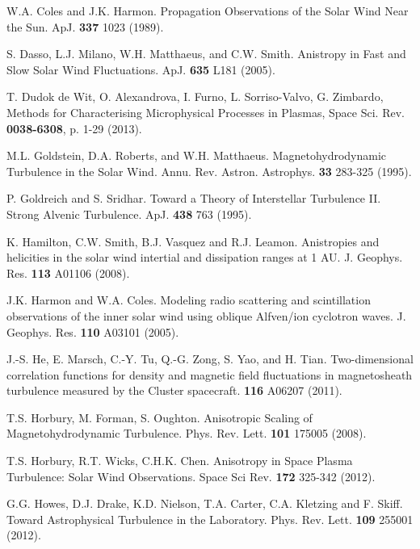 \documentclass[preprint2]{aastex}
\begin{document}
\begin{thebibliography}{}
 W.A. Coles and J.K. Harmon. Propagation Observations of the Solar Wind Near the Sun. ApJ. {\bf 337} 1023 (1989).

 S. Dasso, L.J. Milano, W.H. Matthaeus, and C.W. Smith. Anistropy in Fast and Slow Solar Wind Fluctuations. ApJ. {\bf 635} L181 (2005).

 T. Dudok de Wit, O. Alexandrova, I. Furno, L. Sorriso-Valvo, G. Zimbardo, Methods for Characterising Microphysical Processes in Plasmas, Space Sci. Rev. {\bf 0038-6308}, p. 1-29 (2013).

 M.L. Goldstein, D.A. Roberts, and W.H. Matthaeus. Magnetohydrodynamic Turbulence in the Solar Wind. Annu. Rev. Astron. Astrophys. {\bf 33} 283-325 (1995).

 P. Goldreich and S. Sridhar. Toward a Theory of Interstellar Turbulence II. Strong Alvenic Turbulence. ApJ. {\bf 438} 763 (1995).

 K. Hamilton, C.W. Smith, B.J. Vasquez and R.J. Leamon. Anistropies and helicities in the solar wind intertial and dissipation ranges at 1 AU. J. Geophys. Res. {\bf 113} A01106 (2008).

 J.K. Harmon and W.A. Coles. Modeling radio scattering and scintillation observations of the inner solar wind using oblique Alfven/ion cyclotron waves. J. Geophys. Res. {\bf 110} A03101 (2005).

 J.-S. He, E. Marsch, C.-Y. Tu, Q.-G. Zong, S. Yao, and H. Tian. Two-dimensional correlation functions for density and magnetic field fluctuations in magnetosheath turbulence measured by the Cluster spacecraft. {\bf 116} A06207 (2011).

 T.S. Horbury, M. Forman, S. Oughton. Anisotropic Scaling of Magnetohydrodynamic Turbulence. Phys. Rev. Lett. {\bf 101} 175005 (2008).

 T.S. Horbury, R.T. Wicks, C.H.K. Chen. Anisotropy in Space Plasma Turbulence: Solar Wind Observations. Space Sci Rev. {\bf 172} 325-342 (2012).

 G.G. Howes, D.J. Drake, K.D. Nielson, T.A. Carter, C.A. Kletzing and F. Skiff. Toward Astrophysical Turbulence in the Laboratory. Phys. Rev. Lett. {\bf 109} 255001 (2012).


\end{thebibliography}
\end{document}
